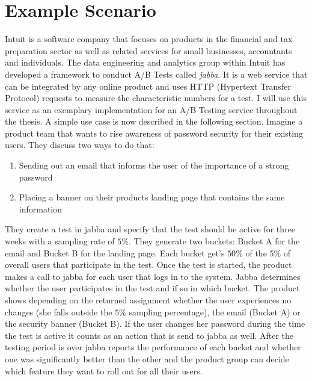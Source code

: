\documentclass[main.tex]{subfiles}
\begin{document}
\section{Example Scenario}
Intuit is a software company that focuses on products in the  financial and tax preparation sector as well as related services for small businesses, accountants and individuals. The data engineering and analytics group within Intuit has developed a framework to conduct A/B Tests called \emph{jabba}. It is a web service that can be integrated by any online product and uses HTTP (Hypertext Transfer Protocol) requests to measure the characteristic numbers for a test. I will use this service as an exemplary implementation for an A/B Testing service throughout the thesis. A simple use case is now described in the following section.\newline
Imagine a product team that wants to rise awareness of password security for their existing users. They discuss two ways to do that:
\begin{enumerate}
  \item Sending out an email that informs the user of the importance of a strong password
  \item Placing a banner on their products landing page that contains the same information
\end{enumerate}
They create a test in jabba and specify that the test should be active for three weeks with a sampling rate of $5\%$. They generate two buckets: Bucket A for the email and Bucket B for the landing page. Each bucket get's $50\%$ of the $5\%$ of overall users that participate in the test. Once the test is started, the product makes a call to jabba for each user that logs in to the system. Jabba determines whether the user participates in the test and if so in which bucket. The product shows depending on the returned assignment whether the user experiences no changes (she falls outside the $5\%$ sampling percentage), the email (Bucket A) or the security banner (Bucket B). If the user changes her password during the time the test is active it counts as an action that is send to jabba as well. After the testing period is over jabba reports the performance of each bucket and whether one was significantly better than the other and the product group can decide which feature they want to roll out for all their users.
\end{document}

